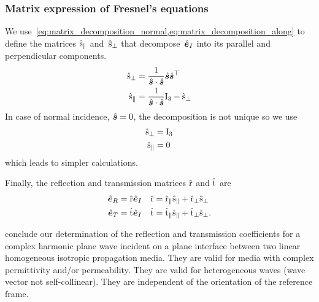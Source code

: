 \subsubsection{Matrix expression of Fresnel's equations}
\label{sec:fresnel_matrix}
We use~\cref{eq:matrix_decomposition_normal,eq:matrix_decomposition_along} to define the matrices $\hat{\mathrm{s}}_\parallel$ and~$\hat{\mathrm{s}}_\perp$ that decompose~$\hat{\bm{e}}_I$ into its parallel and perpendicular components.
\begin{subequations}
    \begin{align}
        \hat{\mathrm{s}}_\perp &= \frac{1}{\hat{\bm{s}} \cdot \hat{\bm{s}}} \hat{\bm{s}} \hat{\bm{s}}^\top
        \label{eq:s_perp}
        \\
        \hat{\mathrm{s}}_\parallel &= \frac{1}{\hat{\bm{s}} \cdot \hat{\bm{s}}} \mathrm{I}_3 - \hat{\mathrm{s}}_\perp
        \label{eq:s_para}
    \end{align}
\end{subequations}
In case of normal incidence, $\hat{\bm{s}}=0$, the decomposition is not unique so we use
\begin{subequations}
    \begin{align}
        \hat{\mathrm{s}}_\perp &= \mathrm{I}_3
        \label{eq:s_perp_normal}
        \\
        \hat{\mathrm{s}}_\parallel &= 0
        \label{eq:s_para_normal}
    \end{align}
\end{subequations}
which leads to simpler calculations.

Finally, the reflection and transmission matrices $\hat{\mathrm{r}}$ and $\hat{\mathrm{t}}$ are
\begin{subequations}
    \begin{align}
        \hat{\bm{e}}_R &= \hat{\mathrm{r}} \hat{\bm{e}}_I
        &
        \hat{\mathrm{r}}
        &=
        \hat{\mathrm{r}}_\parallel \hat{\mathrm{s}}_\parallel +
        \hat{\mathrm{r}}_\perp     \hat{\mathrm{s}}_\perp
        \label{eq:fresnel_reflection_matrix}
        \\
        \hat{\bm{e}}_T &= \hat{\mathrm{t}} \hat{\bm{e}}_I
        &
        \hat{\mathrm{t}}
        &=
        \hat{\mathrm{t}}_\parallel \hat{\mathrm{s}}_\parallel +
        \hat{\mathrm{t}}_\perp     \hat{\mathrm{s}}_\perp
        \text{.}
        \label{eq:fresnel_transmission_matrix}
    \end{align}
\end{subequations}

 conclude our determination of the reflection and transmission coefficients for a complex harmonic plane wave incident on a plane interface between two linear homogeneous isotropic propagation media.
They are valid for media with complex permittivity and/or permeability.
They are valid for heterogeneous waves (wave vector not self-collinear).
They are independent of the orientation of the reference frame.

